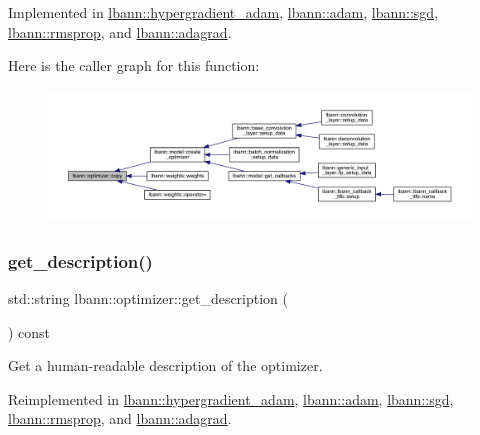 Implemented in \hyperlink{classlbann_1_1hypergradient__adam_a09a7e0bbae7d18cc94a2f5ad098f1f38}{lbann\+::hypergradient\+\_\+adam}, \hyperlink{classlbann_1_1adam_a95866f94044a4e7bb34bf35551ade4cc}{lbann\+::adam}, \hyperlink{classlbann_1_1sgd_a91572d383ad42584bf917e7d62bebe82}{lbann\+::sgd}, \hyperlink{classlbann_1_1rmsprop_a1493737d356809ad5c94f77051de8814}{lbann\+::rmsprop}, and \hyperlink{classlbann_1_1adagrad_a4e8a72adf65df84d15f24fe6be03d1b1}{lbann\+::adagrad}.

Here is the caller graph for this function\+:\nopagebreak
\begin{figure}[H]
\begin{center}
\leavevmode
\includegraphics[width=350pt]{classlbann_1_1optimizer_adf19a1d19d832ebfe70072cc202cdf39_icgraph}
\end{center}
\end{figure}
\mbox{\label{classlbann_1_1optimizer_a66bb8d28dfb41452ac1a75a3efd47723}} 
\subsubsection{\texorpdfstring{get\+\_\+description()}{get\_description()}}
{\footnotesize\ttfamily std\+::string lbann\+::optimizer\+::get\+\_\+description (\begin{DoxyParamCaption}{ }\end{DoxyParamCaption}) const\hspace{0.3cm}{\ttfamily [virtual]}}

Get a human-\/readable description of the optimizer. 

Reimplemented in \hyperlink{classlbann_1_1hypergradient__adam_aadcd02daeca55493b0e7210195ddb6ec}{lbann\+::hypergradient\+\_\+adam}, \hyperlink{classlbann_1_1adam_a14eb9754e2aa38a732d92b6d42311676}{lbann\+::adam}, \hyperlink{classlbann_1_1sgd_a2022661b9ef83e418a0a980207cb231e}{lbann\+::sgd}, \hyperlink{classlbann_1_1rmsprop_a4526482bf60f7f3fc3f60ff70b38cdb7}{lbann\+::rmsprop}, and \hyperlink{classlbann_1_1adagrad_ad8c3000c84809fab63672e9eb35c5370}{lbann\+::adagrad}.



